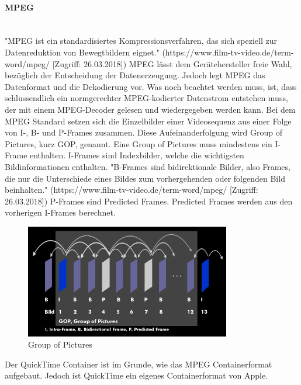 \paragraph{MPEG}
\leavevmode \\
"MPEG ist ein standardisiertes Kompressionsverfahren, das sich speziell zur Datenreduktion von Bewegtbildern eignet." (https://www.film-tv-video.de/term-word/mpeg/ [Zugriff: 26.03.2018]) MPEG lässt dem Gerätehersteller freie Wahl, bezüglich der Entscheidung der Datenerzeugung. Jedoch legt MPEG das Datenformat und die Dekodierung vor. Was noch beachtet werden muss, ist, dass schlussendlich ein normgerechter MPEG-kodierter Datenstrom entstehen muss, der mit einem MPEG-Decoder gelesen und wiedergegeben werden kann. Bei dem MPEG Standard setzen sich die Einzelbilder einer Videosequenz aus einer Folge von I-, B- und P-Frames zusammen. Diese Aufeinanderfolgung wird Group of Pictures, kurz GOP, genannt. Eine Group of Pictures muss mindestens ein I-Frame enthalten. I-Frames sind Indexbilder, welche die wichtigsten Bildinformationen enthalten. "B-Frames sind  bidirektionale Bilder, also Frames, die nur die Unterschiede eines Bildes zum vorhergehenden oder folgenden Bild beinhalten." (https://www.film-tv-video.de/term-word/mpeg/ [Zugriff: 26.03.2018]) P-Frames sind Predicted Frames. Predicted Frames werden aus den vorherigen I-Frames berechnet.\newline
\begin{figure}[H]
	\centering
	\includegraphics[width=0.8\textwidth]{abb27} 
	\caption[Group of Pictures]{Group of Pictures\footnotemark}
\end{figure}
Der QuickTime Container ist im Grunde, wie das MPEG Containerformat aufgebaut. Jedoch ist QuickTime ein eigenes Containerformat von Apple.\citep{mpeg}
